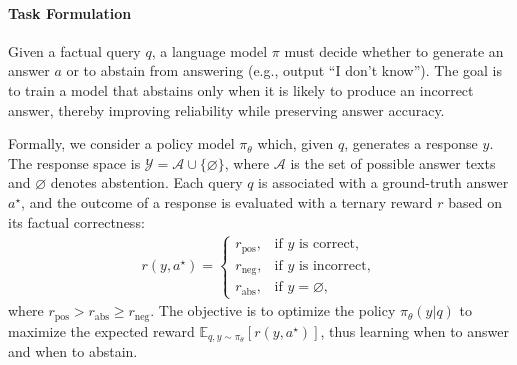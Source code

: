 \documentclass{article} %
\begin{document}
\paragraph{Task Formulation} Given a factual query $q$, a language model $\pi$ must decide whether to generate an answer $a$ or to abstain from answering (e.g., output ``I don't know''). The goal is to train a model that abstains only when it is likely to produce an incorrect answer, thereby improving reliability while preserving answer accuracy.

Formally, we consider a policy model $\pi_\theta$ which, given $q$, generates a response $y$. The response space is $\mathcal{Y} = \mathcal{A} \cup \{\varnothing\}$, where $\mathcal{A}$ is the set of possible answer texts and $\varnothing$ denotes abstention. Each query $q$ is associated with a ground-truth answer $a^\star$, and the outcome of a response is evaluated with a ternary reward $r$ based on its factual correctness:
\begin{align}
    r(y, a^\star) =
\begin{cases}
r_{\text{pos}}, & \text{if } y \text{ is correct}, \\
r_{\text{neg}}, & \text{if } y \text{ is incorrect}, \\
r_{\text{abs}}, & \text{if } y = \varnothing,
\end{cases}
\end{align}
where $r_{\text{pos}} > r_{\text{abs}} \ge r_{\text{neg}}$. The objective is to optimize the policy $\pi_\theta(y|q)$ to maximize the expected reward $\mathbb{E}_{q, y \sim \pi_\theta}[r(y, a^\star)]$, thus learning when to answer and when to abstain.

\end{document}
